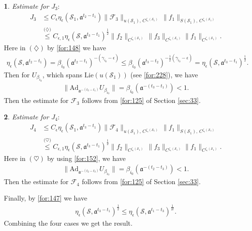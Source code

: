 \documentclass[11 pt]{amsart}
\newcommand{\norm}[1]{\lVert#1\rVert}
\theoremstyle{definition}
\newtheorem{sect}{}
\numberwithin{equation}{section}
\begin{document}
\begin{sect} \emph{Estimate for $J_3$}:
\begin{align*}
J_3&\leq C_\epsilon \eta_{\epsilon}(\mathcal{S}_1, \mathfrak{a}^{t_{2}-t_{ 1}})\norm{\mathcal{F}_3}_{u(\mathcal{S}_1),\,C^{\zeta_\epsilon(\mathcal{S}_1)}}\,\big\|f_1\big\|_{S(\mathcal{S}_1),\,C^{\zeta_\epsilon(\mathcal{S}_1)}}\\
 &\overset{\text{($\diamondsuit$)}}{\leq}C_{\epsilon,1} \eta_{\epsilon} (\mathcal{S}, \mathfrak{a}^{t_3-t_{1}})^{\frac{1}{2}}\norm{f_2}_{C^{\zeta_\epsilon(\mathcal{S}_1)}}\,\big\|f_3\big\|_{C^{\zeta_\epsilon(\mathcal{S}_1)}}
 \big\|f_1\big\|_{C^{\zeta_\epsilon(\mathcal{S}_1)}}.
\end{align*}
Here in $(\diamondsuit)$ by \eqref{for:148} we have
  \begin{align*}
   \eta_{\epsilon} (\mathcal{S}, \mathfrak{a}^{t_2-t_{1}})=\beta_{i_0}(\mathfrak{a}^{t_2-t_{1}})^{-(\gamma_{i_0}-\epsilon)}
   \leq\beta_{i_0}(\mathfrak{a}^{t_3-t_{2}})^{-\frac{1}{2}(\gamma_{i_0}-\epsilon)}= \eta_{\epsilon} (\mathcal{S}, \mathfrak{a}^{t_3-t_{1}})^{\frac{1}{2}}.
  \end{align*}
   Then for $U_{\beta_{i_0}}$, which spans $\text{Lie}(u(\mathcal{S}_1))$ (see \eqref{for:228}), we have
  \begin{align*}
 \|\text{Ad}_{\mathfrak{a}^{-(t_{3}-t_{1})}}U_{\beta_{i_0}}\|=\beta_{i_0}(\mathfrak{a}^{-(t_{3}-t_{ 1})})< 1.
\end{align*}
   Then the estimate for $\mathcal{F}_3$ follows from \eqref{for:125} of Section \ref{sec:33}.
\end{sect}
\begin{sect} \emph{Estimate for $J_4$}:
\begin{align*}
J_4&\leq C_\epsilon \eta_{\epsilon}(\mathcal{S}_1, \mathfrak{a}^{t_{3}-t_{ 1}})\norm{\mathcal{F}_4}_{u(\mathcal{S}_1),\,C^{\zeta_\epsilon(\mathcal{S}_1)}}\,\big\|f_1\big\|_{S(\mathcal{S}_1),\,C^{\zeta_\epsilon(\mathcal{S}_1)}}\\
&\overset{\text{($\heartsuit$)}}{\leq}C_{\epsilon,1} \eta_{\epsilon} (\mathcal{S}, \mathfrak{a}^{t_3-t_{1}})^{\frac{1}{2}}\norm{f_2}_{C^{\zeta_\epsilon(\mathcal{S}_1)}}\,\big\|f_3\big\|_{C^{\zeta_\epsilon(\mathcal{S}_1)}}
 \big\|f_1\big\|_{C^{\zeta_\epsilon(\mathcal{S}_1)}}.
 \end{align*}
 Here in $(\heartsuit)$ by using \eqref{for:152}, we have
 \begin{align*}
 \|\text{Ad}_{\mathfrak{a}^{-(t_{2}-t_{3})}}U_{\beta_{i_0}}\|=\beta_{i_0}(\mathfrak{a}^{-(t_{2}-t_{ 3})})< 1.
\end{align*}
   Then the estimate for $\mathcal{F}_4$ follows from \eqref{for:125} of Section \ref{sec:33}.
\end{sect}
Finally, by  \eqref{for:147} we have
\begin{align*}
 \eta_{\epsilon} (\mathcal{S}, \mathfrak{a}^{t_3-t_{1}})^{\frac{1}{2}}\leq \eta_{\epsilon} (\mathcal{S}, \mathfrak{a}^{t_1-t_{3}})^{\frac{1}{2l}}.
\end{align*}
Combining the four cases we get the result.
\end{document}
